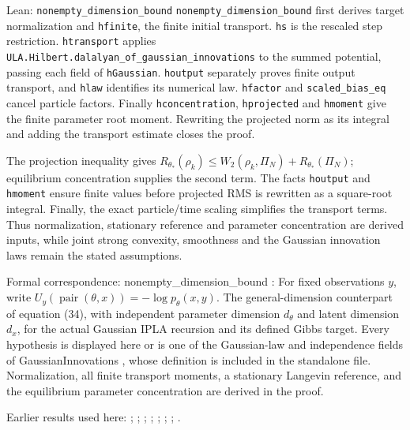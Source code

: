 \documentclass[11pt,a4paper]{article}
\begin{document}
\begin{leanbox}{Lean: \texttt{nonempty\_\allowbreak{}dimension\_\allowbreak{}bound}}
\texttt{nonempty\_\allowbreak{}dimension\_\allowbreak{}bound} first derives target normalization and \texttt{hfinite}, the finite initial transport. \texttt{hs} is the rescaled step restriction. \texttt{htransport} applies \texttt{ULA.\allowbreak{}Hilbert.\allowbreak{}dalalyan\_\allowbreak{}of\_\allowbreak{}gaussian\_\allowbreak{}innovations} to the summed potential, passing each field of \texttt{h\allowbreak{}Gaussian}. \texttt{houtput} separately proves finite output transport, and \texttt{hlaw} identifies its numerical law. \texttt{hfactor} and \texttt{scaled\_\allowbreak{}bias\_\allowbreak{}eq} cancel particle factors. Finally \texttt{hconcentration}, \texttt{hprojected} and \texttt{hmoment} give the finite parameter root moment. Rewriting the projected norm as its integral and adding the transport estimate closes the proof.



The projection inequality gives \(R_{\theta_*}(\rho_k)\le W_2(\rho_k,\Pi_N)+R_{\theta_*}(\Pi_N)\); equilibrium concentration supplies the second term. The facts \texttt{houtput} and \texttt{hmoment} ensure finite values before projected RMS is rewritten as a square-root integral. Finally, the exact particle/\allowbreak{}time scaling simplifies the transport terms. Thus normalization, stationary reference and parameter concentration are derived inputs, while joint strong convexity, smoothness and the Gaussian innovation laws remain the stated assumptions.



Formal correspondence: nonempty\_dimension\_bound : For fixed observations \(y\), write \(U_y(\operatorname{pair}(\theta,x))=-\log p_\theta(x,y)\). The general-dimension counterpart of equation (34), with independent parameter dimension \(d_\theta\) and latent dimension \(d_x\), for the actual Gaussian IPLA recursion and its defined Gibbs target. Every hypothesis is displayed here or is one of the Gaussian-law and independence fields of GaussianInnovations , whose definition is included in the standalone file. Normalization, all finite transport moments, a stationary Langevin reference, and the equilibrium parameter concentration are derived in the proof.
\end{leanbox}


Earlier results used here: \cite[Section~3.17.4]{LangevinLean2026ULASC}; \cite[Section~3.26.3]{LangevinLean2026ULASC}; \cite[Section~3.45.6]{LangevinLean2026ULASC}; \cite[Section~3.48.6]{LangevinLean2026ULASC}; \cite[Section~3.48.7]{LangevinLean2026ULASC}; \cite[Section~3.48.9]{LangevinLean2026ULASC}; \cite[Section~3.50.2]{LangevinLean2026ULASC}; \cite[Section~3.50.3]{LangevinLean2026ULASC}.
\end{document}
